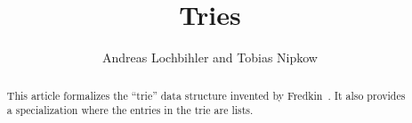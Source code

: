 \documentclass[11pt,a4paper]{article}
\begin{document}
\title{Tries}
\author{Andreas Lochbihler and Tobias Nipkow}
\maketitle

\begin{abstract}
  This article formalizes the ``trie'' data structure invented by
  Fredkin~\cite{Fredkin}. It also provides a specialization where the entries
  in the trie are lists.
\end{abstract}

\tableofcontents





\end{document}
